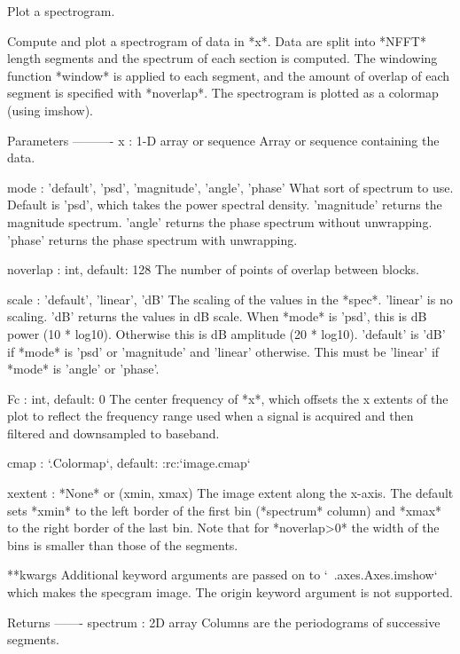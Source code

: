 \begin{DoxyVerb}
\begin{DoxyVerb}Plot a spectrogram.

Compute and plot a spectrogram of data in *x*.  Data are split into
*NFFT* length segments and the spectrum of each section is
computed.  The windowing function *window* is applied to each
segment, and the amount of overlap of each segment is
specified with *noverlap*. The spectrogram is plotted as a colormap
(using imshow).

Parameters
----------
x : 1-D array or sequence
    Array or sequence containing the data.



mode : {'default', 'psd', 'magnitude', 'angle', 'phase'}
    What sort of spectrum to use.  Default is 'psd', which takes the
    power spectral density.  'magnitude' returns the magnitude
    spectrum.  'angle' returns the phase spectrum without unwrapping.
    'phase' returns the phase spectrum with unwrapping.

noverlap : int, default: 128
    The number of points of overlap between blocks.

scale : {'default', 'linear', 'dB'}
    The scaling of the values in the *spec*.  'linear' is no scaling.
    'dB' returns the values in dB scale.  When *mode* is 'psd',
    this is dB power (10 * log10).  Otherwise this is dB amplitude
    (20 * log10). 'default' is 'dB' if *mode* is 'psd' or
    'magnitude' and 'linear' otherwise.  This must be 'linear'
    if *mode* is 'angle' or 'phase'.

Fc : int, default: 0
    The center frequency of *x*, which offsets the x extents of the
    plot to reflect the frequency range used when a signal is acquired
    and then filtered and downsampled to baseband.

cmap : `.Colormap`, default: :rc:`image.cmap`

xextent : *None* or (xmin, xmax)
    The image extent along the x-axis. The default sets *xmin* to the
    left border of the first bin (*spectrum* column) and *xmax* to the
    right border of the last bin. Note that for *noverlap>0* the width
    of the bins is smaller than those of the segments.

**kwargs
    Additional keyword arguments are passed on to `~.axes.Axes.imshow`
    which makes the specgram image. The origin keyword argument
    is not supported.

Returns
-------
spectrum : 2D array
    Columns are the periodograms of successive segments.


\end{DoxyVerb}
\end{DoxyVerb}
